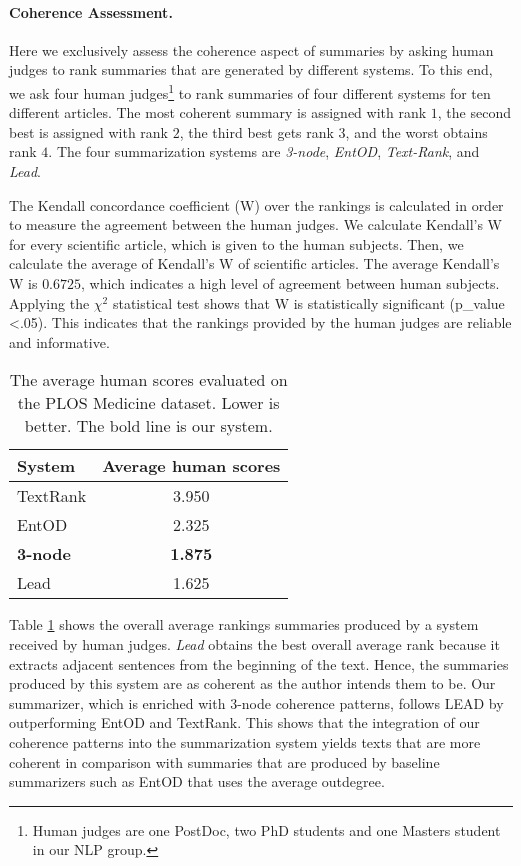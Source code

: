 \paragraph{Coherence Assessment.} 
Here we exclusively assess the coherence aspect of summaries by asking human judges to rank summaries that are generated by different systems. 
To this end, we ask four human judges\footnote{Human judges are one PostDoc, two PhD students and one Masters student in our NLP group.} to rank summaries of four different systems for ten different articles. 
The most coherent summary is assigned with rank $1$, the second best is assigned with rank $2$, the third best gets rank $3$, and the worst obtains rank $4$.
The four summarization systems are
\emph{3-node}, \emph{EntOD}, \emph{Text-Rank}, and \emph{Lead}.

The Kendall concordance coefficient (W) \cite{siegel88} over the rankings is calculated in order to measure the agreement between the human judges.  
We calculate Kendall's W for every scientific article, which is given to the human subjects. 
Then, we calculate the average of Kendall's W of scientific articles. 
The average Kendall's W is $0.6725$, which indicates a high level of agreement between human subjects.
Applying the $\chi^2$ statistical test shows that W is statistically significant (p\_value <.05).  This indicates that the rankings provided by the human judges are reliable and informative.


\begin{table}[!ht]
	\begin{center}
		\begin{tabular}{lc}
		\toprule
		\textbf{System} 				&  \textbf{Average human scores} \\
		\midrule
		TextRank 			& 3.950					\\
		EntOD 				& 2.325					\\
		\textbf{3-node}		& \textbf{1.875} 		\\
		Lead 				& 1.625					\\
		\bottomrule
		\end{tabular}
	\end{center}
	\caption{The average human scores evaluated on the PLOS Medicine dataset. Lower is better. 
	The bold line is our system.}
	\label{tab:summary-human}
\end{table}

Table \ref{tab:summary-human} shows the overall average rankings summaries produced by a system received by human judges. 
\emph{Lead} obtains the best overall average rank because it extracts adjacent sentences from the beginning of the text. 
Hence, the summaries produced by this system are as coherent as the author intends them to be. 
Our summarizer, which is enriched with 3-node coherence patterns, follows LEAD by outperforming EntOD and TextRank.  
This shows that the integration of our coherence patterns into the summarization system yields texts that are more coherent in comparison with summaries that are produced by baseline summarizers such as EntOD that uses the average outdegree.  

